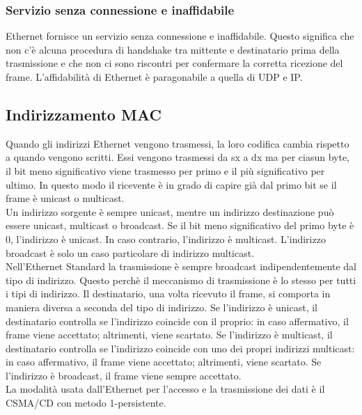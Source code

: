 \documentclass[12pt]{report}
\begin{document}
\subsubsection{Servizio senza connessione e inaffidabile}
Ethernet fornisce un servizio senza connessione e inaffidabile. Questo significa che non c'è alcuna procedura di handshake tra mittente e destinatario prima della trasmissione e che non ci sono riscontri per confermare la corretta ricezione del frame. L'affidabilità di Ethernet è paragonabile a quella di UDP e IP.

\subsection{Indirizzamento MAC}
Quando gli indirizzi Ethernet vengono trasmessi, la loro codifica cambia rispetto a quando vengono scritti. Essi vengono trasmessi da sx a dx ma per ciasun byte, il bit meno significativo viene trasmesso per primo e il più significativo per ultimo. In questo modo il ricevente è in grado di capire già dal primo bit se il frame è unicast o multicast.
\vspace{\baselineskip}\\
Un indirizzo sorgente è sempre unicast, mentre un indirizzo destinazione può essere unicast, multicast o broadcast. Se il bit meno significativo del primo byte è 0, l'indirizzo è unicast. In caso contrario, l'indirizzo è multicast. L'indirizzo broadcast è solo un caso particolare di indirizzo multicast.
\vspace{\baselineskip}\\
Nell'Ethernet Standard la trasmissione è sempre broadcast indipendentemente dal tipo di indirizzo. Questo perchè il meccanismo di trasmissione è lo stesso per tutti i tipi di indirizzo. Il destinatario, una volta ricevuto il frame, si comporta in maniera diversa a seconda del tipo di indirizzo. Se l'indirizzo è unicast, il destinatario controlla se l'indirizzo coincide con il proprio: in caso affermativo, il frame viene accettato; altrimenti, viene scartato. Se l'indirizzo è multicast, il destinatario controlla se l'indirizzo coincide con uno dei propri indirizzi multicast: in caso affermativo, il frame viene accettato; altrimenti, viene scartato. Se l'indirizzo è broadcast, il frame viene sempre accettato.
\vspace{\baselineskip}\\
La modalità usata dall'Ethernet per l'accesso e la trasmissione dei dati è il CSMA/CD con metodo 1-persistente.
\end{document}
